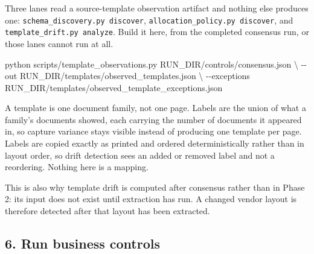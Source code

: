 \documentclass[
]{article}
\newenvironment{Shaded}{}{}
\newcommand{\AttributeTok}[1]{\textcolor[rgb]{0.49,0.56,0.16}{#1}}
\newcommand{\DataTypeTok}[1]{\textcolor[rgb]{0.56,0.13,0.00}{#1}}
\newcommand{\ExtensionTok}[1]{#1}
\newcommand{\NormalTok}[1]{#1}
\begin{document}
Three lanes read a source-template observation artifact and nothing else
produces one: \texttt{schema\_\allowbreak{}discovery.py discover},
\texttt{allocation\_\allowbreak{}policy.py discover}, and
\texttt{template\_\allowbreak{}drift.py analyze}. Build it here, from
the completed consensus run, or those lanes cannot run at all.

\begin{Shaded}
\begin{Highlighting}[]
\ExtensionTok{python}\NormalTok{ scripts/template\_observations.py RUN\_DIR/controls/consensus.json }\DataTypeTok{\textbackslash{}}
  \AttributeTok{{-}{-}out}\NormalTok{ RUN\_DIR/templates/observed\_templates.json }\DataTypeTok{\textbackslash{}}
  \AttributeTok{{-}{-}exceptions}\NormalTok{ RUN\_DIR/templates/observed\_template\_exceptions.json}
\end{Highlighting}
\end{Shaded}

A template is one document family, not one page. Labels are the union of
what a family's documents showed, each carrying the number of documents
it appeared in, so capture variance stays visible instead of producing
one template per page. Labels are copied exactly as printed and ordered
deterministically rather than in layout order, so drift detection sees
an added or removed label and not a reordering. Nothing here is a
mapping.

This is also why template drift is computed after consensus rather than
in Phase 2: its input does not exist until extraction has run. A changed
vendor layout is therefore detected after that layout has been
extracted.

\subsection{6. Run business controls}\label{run-business-controls}
\end{document}
